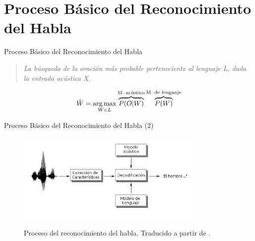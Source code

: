 \section{Proceso B\'asico del Reconocimiento del Habla}

\begin{frame}{Proceso B\'asico del Reconocimiento del Habla}

\begin{quote}
\emph{La b\'usqueda de la oraci\'on m\'as probable perteneciente al lenguaje L, dada la entrada ac\'ustica X.}
\end{quote}

\begin{align}
\hat{W} = \operatorname*{arg\,max}_{W \in L} \overbrace{P(O|W)}^\text{M. ac\'ustico}\overbrace{P(W)}^\text{M. de lenguaje}
\label{eq:asrFundamental}
\end{align}
\end{frame}

\begin{frame}{Proceso B\'asico del Reconocimiento del Habla (2)}

\begin{figure}[H] 
\centering
\includegraphics[width=0.8\textwidth]{./graphics/proceso.png}
\caption{Proceso del reconocimiento del habla. Traducido a partir de \protect\cite{VerenichASR}.}
\label{figure:proceso}
\end{figure}
\end{frame}

